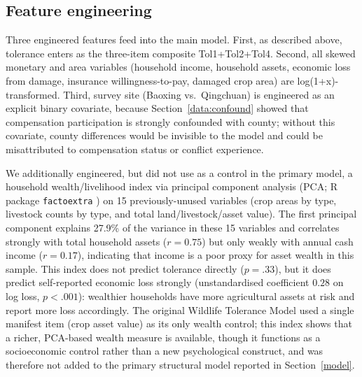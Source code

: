 \subsection{Feature engineering}
\label{measurement:features}

Three engineered features feed into the main model. First, as described
above, tolerance enters as the three-item composite Tol1+Tol2+Tol4. Second,
all skewed monetary and area variables (household income, household assets,
economic loss from damage, insurance willingness-to-pay, damaged crop area)
are log(1+x)-transformed. Third, survey site (Baoxing vs.\ Qingchuan) is
engineered as an explicit binary covariate, because Section~\ref{data:confound}
showed that compensation participation is strongly confounded with county;
without this covariate, county differences would be invisible to the model
and could be misattributed to compensation status or conflict experience.

We additionally engineered, but did not use as a control in the primary
model, a household wealth/livelihood index via principal component analysis
(PCA; R package \texttt{factoextra} \citep{Rfactoextra}) on 15 previously-unused variables (crop areas by type, livestock counts
by type, and total land/livestock/asset value). The first principal component
explains 27.9\% of the variance in these 15 variables and correlates strongly
with total household assets ($r = 0.75$) but only weakly with annual cash
income ($r = 0.17$), indicating that income is a poor proxy for asset wealth
in this sample. This index does not predict tolerance directly ($p = .33$),
but it does predict self-reported economic loss strongly
(unstandardised coefficient $0.28$ on log loss, $p < .001$): wealthier households have more agricultural
assets at risk and report more loss accordingly. The original Wildlife
Tolerance Model used a single manifest item (crop asset value) as its only
wealth control; this index shows that a richer, PCA-based wealth measure is
available, though it functions as a socioeconomic control rather than a new
psychological construct, and was therefore not added to the primary
structural model reported in Section~\ref{model}.
